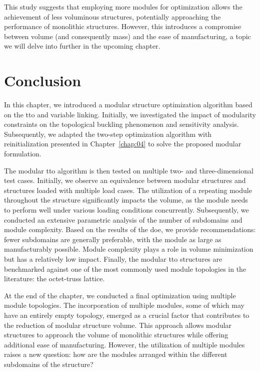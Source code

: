     This study suggests that employing more modules for optimization allows the achievement of less voluminous structures, potentially approaching the performance of monolithic structures. However, this introduces a compromise between volume (and consequently mass) and the ease of manufacturing, a topic we will delve into further in the upcoming chapter.

\section{Conclusion}
In this chapter, we introduced a modular structure optimization algorithm based on the \acrfull{tto} and variable linking. Initially, we investigated the impact of modularity constraints on the topological buckling phenomenon and sensitivity analysis. Subsequently, we adapted the two-step optimization algorithm with reinitialization presented in Chapter~\ref{chap:04} to solve the proposed modular formulation.

The modular \gls{tto} algorithm is then tested on multiple two- and three-dimensional test cases. Initially, we observe an equivalence between modular structures and structures loaded with multiple load cases. The utilization of a repeating module throughout the structure significantly impacts the volume, as the module needs to perform well under various loading conditions concurrently. Subsequently, we conducted an extensive parametric analysis of the number of subdomains and module complexity. Based on the results of the \acrfull{doe}, we provide recommendations: fewer subdomains are generally preferable, with the module as large as manufacturably possible. Module complexity plays a role in volume minimization but has a relatively low impact. Finally, the modular \gls{tto} structures are benchmarked against one of the most commonly used module topologies in the literature: the octet-truss lattice.

At the end of the chapter, we conducted a final optimization using multiple module topologies. The incorporation of multiple modules, some of which may have an entirely empty topology, emerged as a crucial factor that contributes to the reduction of modular structure volume. This approach allows modular structures to approach the volume of monolithic structures while offering additional ease of manufacturing. However, the utilization of multiple modules raises a new question: how are the modules arranged within the different subdomains of the structure?